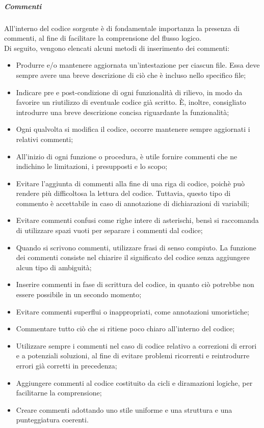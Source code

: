 		\subparagraph{Commenti}
		All'interno del codice sorgente è di fondamentale importanza la presenza di commenti, al fine di facilitare la comprensione del flusso logico.\\
		Di seguito, vengono elencati alcuni metodi di inserimento dei commenti:
		\begin{itemize}
			\item Produrre e/o mantenere aggiornata un'intestazione per ciascun file. Essa deve sempre avere una breve descrizione di ciò che è incluso nello specifico file;
			\item Indicare pre e post-condizione di ogni funzionalità di rilievo, in modo da favorire un riutilizzo di eventuale codice già scritto. \MakeUppercase{è}, inoltre, consigliato introdurre una breve descrizione concisa riguardante la funzionalità;
			\item Ogni qualvolta si modifica il codice, occorre mantenere sempre aggiornati i relativi commenti;
			\item All'inizio di ogni funzione o procedura, è utile fornire commenti che ne indichino le limitazioni, i presupposti e lo scopo;
			\item Evitare l'aggiunta di commenti alla fine di una riga di codice, poichè può rendere più difficoltosa la lettura del codice. Tuttavia, questo tipo di commento è accettabile in caso di annotazione di dichiarazioni di variabili;
			\item Evitare commenti confusi come righe intere di asterischi, bensì si raccomanda di utilizzare spazi vuoti per separare i commenti dal codice;
			\item Quando si scrivono commenti, utilizzare frasi di senso compiuto. La funzione dei commenti consiste nel chiarire il significato del codice senza aggiungere alcun tipo di ambiguità;
			\item Inserire commenti in fase di scrittura del codice, in quanto ciò potrebbe non essere possibile in un secondo momento;
			\item Evitare commenti superflui o inappropriati, come annotazioni umoristiche;
			\item Commentare tutto ciò che si ritiene poco chiaro all'interno del codice;
			\item Utilizzare sempre i commenti nel caso di codice relativo a correzioni di errori e a potenziali soluzioni, al fine di evitare problemi ricorrenti e reintrodurre errori già corretti in precedenza;
			\item Aggiungere commenti al codice costituito da cicli e diramazioni logiche, per facilitarne la comprensione;
			\item Creare commenti adottando uno stile uniforme e una struttura e una punteggiatura coerenti.
		\end{itemize}
	
